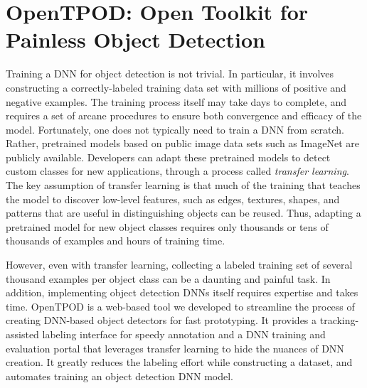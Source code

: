 \section{OpenTPOD: Open Toolkit for Painless Object Detection}
\label{sec: app-dev-tpod}

Training a DNN for object detection is not trivial.  In particular, it involves
constructing a correctly-labeled training data set with millions of positive and
negative examples. The training process itself may take days to complete, and
requires a set of arcane procedures to ensure both convergence and efficacy of
the model. Fortunately, one does not typically need to train a DNN from scratch.
Rather, pretrained models based on public image data sets such as ImageNet are
publicly available. Developers can adapt these pretrained models to detect
custom classes for new applications, through a process called \emph{transfer
  learning}.  The key assumption of transfer learning is that much of the training
that teaches the model to discover low-level features, such as edges, textures,
shapes, and patterns that are useful in distinguishing objects can be reused.
Thus, adapting a pretrained model for new object classes requires only thousands
or tens of thousands of examples and hours of training time.

However, even with transfer learning, collecting a labeled training set of
several thousand examples per object class can be a daunting and painful task.
In addition, implementing object detection DNNs itself requires expertise and
takes time. OpenTPOD is a web-based tool we developed to streamline the process of
creating DNN-based object detectors for fast prototyping. It provides a
tracking-assisted labeling interface for speedy annotation and a DNN training
and evaluation portal that leverages transfer learning to hide the nuances of
DNN creation. It greatly reduces the labeling effort while constructing a
dataset, and automates training an object detection DNN model.


